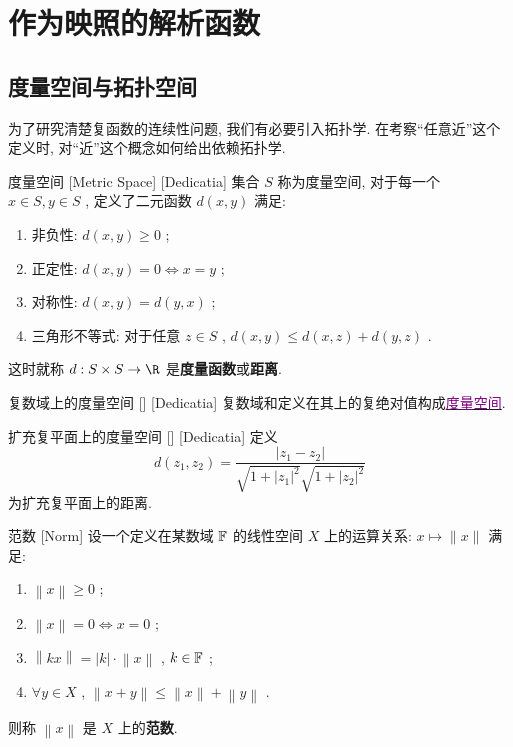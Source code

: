 \documentclass[UTF8]{ctexart}
\newcommand{\hyperrefc}[2]{\hyperref[#1]{\textcolor{purple}{#2}}}
\begin{document}
\section{作为映照的解析函数}
\subsection{度量空间与拓扑空间}
为了研究清楚复函数的连续性问题, 我们有必要引入拓扑学. 在考察“任意近”这个定义时, 对“近”这个概念如何给出依赖拓扑学. 
\begin{dfn}
    [MetricSpace]
    {度量空间}
    [Metric Space]
    [Dedicatia]
    集合 \( S \) 称为度量空间, 对于每一个 \( x\in S, y\in S \) , 定义了二元函数 \( d(x,y) \) 满足: 
    \begin{enumerate}
        \item 非负性:  \( d(x,y)\geqslant 0 \) ;
        \item 正定性:  \( d(x,y)=0\Longleftrightarrow x=y \) ;
        \item 对称性:  \( d(x,y)=d(y,x) \) ;
        \item 三角形不等式: 对于任意 \( z\in S \) ,  \( d(x,y)\leqslant d(x,z)+d(y,z) \) .
    \end{enumerate}
    这时就称 \( d:S\times S\to \R \) 是\textbf{度量函数}或\textbf{距离}. 
\end{dfn}
\begin{xmp}
    [UUID]
    {复数域上的度量空间}
    []
    [Dedicatia]
    复数域和定义在其上的复绝对值构成\hyperrefc{dfn:MetricSpace}{度量空间}. 
\end{xmp}
\begin{xmp}
    [UUID]
    {扩充复平面上的度量空间}
    []
    [Dedicatia]
    定义
    \[d(z_1,z_2)=\frac{|z_1-z_2|}{\sqrt{1+|z_1|^2}\sqrt{1+|z_2|^2}}\]
    为扩充复平面上的距离. 
\end{xmp}
\begin{dfn}
    {范数}
    [Norm]
    设一个定义在某数域 \( \operatorname{\mathbb{F}} \) 的线性空间 \( X \) 上的运算关系:  \( x\mapsto\lVert x\rVert \) 满足: 
    \begin{enumerate}
        \item  \( \left\lVert x\right\rVert\geq 0 \) ;
        \item  \( \left\lVert x\right\rVert=0\Longleftrightarrow x=0 \) ;
        \item  \( \left\lVert kx\right\rVert=|k|\cdot\left\lVert x\right\rVert  \) ,  \( k\in\operatorname{\mathbb{F}} \) ;
        \item  \( \forall y\in X \) ,  \( \left\lVert x+y\right\rVert\leq\left\lVert x\right\rVert+\left\lVert y\right\rVert    \) . 
    \end{enumerate}
    则称 \( \left\lVert x\right\rVert  \) 是 \( X \) 上的\textbf{范数}.
\end{dfn}
\end{document}
